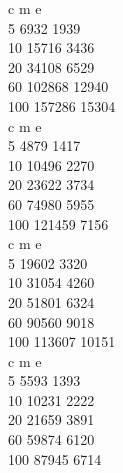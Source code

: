 
    c     m        e      \\
    5     6932     1939   \\
    10    15716    3436   \\
    20    34108    6529   \\
    60    102868   12940  \\
    100   157286   15304  \\

    c     m        e      \\
    5     4879     1417   \\
    10    10496    2270   \\
    20    23622    3734   \\
    60    74980    5955   \\
    100   121459   7156   \\

    c     m        e      \\
    5     19602    3320   \\
    10    31054    4260   \\
    20    51801    6324   \\
    60    90560    9018   \\
    100   113607   10151  \\

    c     m        e      \\
    5     5593     1393   \\
    10    10231    2222   \\
    20    21659    3891   \\
    60    59874    6120   \\
    100   87945    6714   \\

